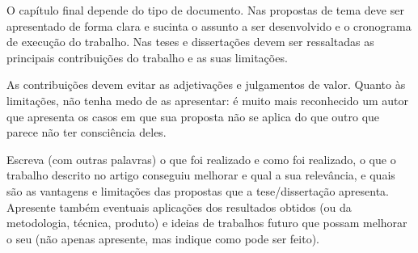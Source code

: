 
\label{Cap:Conclusao}

O capítulo final depende do tipo de documento. Nas propostas de tema
deve ser apresentado de forma clara e sucinta o assunto a ser
desenvolvido e o cronograma de execução do trabalho. Nas teses e
dissertações devem ser ressaltadas as principais contribuições do
trabalho e as suas limitações.

As contribuições devem evitar as adjetivações e julgamentos de valor.
Quanto às limitações, não tenha medo de as apresentar: é muito mais
reconhecido um autor que apresenta os casos em que sua proposta não se
aplica do que outro que parece não ter consciência deles.

Escreva (com outras palavras) o que foi realizado e como foi realizado, o que o trabalho descrito no artigo conseguiu melhorar e qual a sua relevância, e quais são as vantagens e limitações das propostas que a tese/dissertação apresenta. Apresente também eventuais aplicações dos resultados obtidos (ou da metodologia, técnica, produto) e ideias de trabalhos futuro que possam melhorar o seu (não apenas apresente, mas indique como pode ser feito).

%
%
%
%

